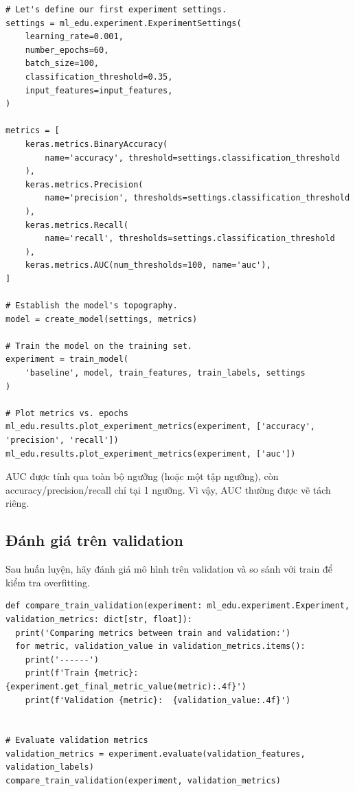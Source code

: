 \documentclass[12pt,a4paper]{article}
\begin{document}
\begin{lstlisting}
# Let's define our first experiment settings.
settings = ml_edu.experiment.ExperimentSettings(
    learning_rate=0.001,
    number_epochs=60,
    batch_size=100,
    classification_threshold=0.35,
    input_features=input_features,
)

metrics = [
    keras.metrics.BinaryAccuracy(
        name='accuracy', threshold=settings.classification_threshold
    ),
    keras.metrics.Precision(
        name='precision', thresholds=settings.classification_threshold
    ),
    keras.metrics.Recall(
        name='recall', thresholds=settings.classification_threshold
    ),
    keras.metrics.AUC(num_thresholds=100, name='auc'),
]

# Establish the model's topography.
model = create_model(settings, metrics)

# Train the model on the training set.
experiment = train_model(
    'baseline', model, train_features, train_labels, settings
)

# Plot metrics vs. epochs
ml_edu.results.plot_experiment_metrics(experiment, ['accuracy', 'precision', 'recall'])
ml_edu.results.plot_experiment_metrics(experiment, ['auc'])
\end{lstlisting}

\begin{luuy}[title={Vì sao vẽ AUC riêng?}]
AUC được tính qua toàn bộ ngưỡng (hoặc một tập ngưỡng), còn accuracy/precision/recall chỉ tại 1 ngưỡng.
Vì vậy, AUC thường được vẽ tách riêng.
\end{luuy}

\subsection{Đánh giá trên validation}

\begin{phuongphap}[title={So sánh train và validation}]
Sau huấn luyện, hãy đánh giá mô hình trên validation và so sánh với train để kiểm tra overfitting.
\end{phuongphap}

\begin{lstlisting}
def compare_train_validation(experiment: ml_edu.experiment.Experiment, validation_metrics: dict[str, float]):
  print('Comparing metrics between train and validation:')
  for metric, validation_value in validation_metrics.items():
    print('------')
    print(f'Train {metric}: {experiment.get_final_metric_value(metric):.4f}')
    print(f'Validation {metric}:  {validation_value:.4f}')


# Evaluate validation metrics
validation_metrics = experiment.evaluate(validation_features, validation_labels)
compare_train_validation(experiment, validation_metrics)
\end{lstlisting}
\end{document}
